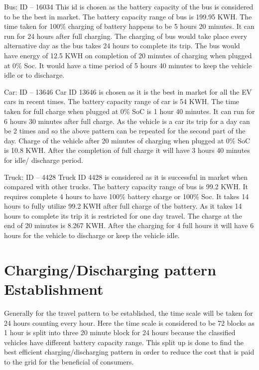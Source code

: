 	Bus: ID – 16034 \cite{evdata}
	This id is chosen as the battery capacity of the bus is considered to be the best in market. The
	battery capacity range of bus is 199.95 KWH. The time taken for 100\% charging of battery
	happens to be 5 hours 20 minutes. It can run for 24 hours after full charging. The charging of
	bus would take place every alternative day as the bus takes 24 hours to complete its trip. The
	bus would have energy of 12.5 KWH on completion of 20 minutes of charging when plugged
	at 0\% Soc. It would have a time period of 5 hours 40 minutes to keep the vehicle idle or to
	discharge.
	
	Car: ID – 13646 \cite{evdata}
	Car ID 13646 is chosen as it is the best in market for all the EV cars in recent times. The
	battery capacity range of car is 54 KWH. The time taken for full charge when plugged at 0\%
	SoC is 1 hour 40 minutes. It can run for 6 hours 30 minutes after full charge. As the vehicle is
	a car its trip for a day can be 2 times and so the above pattern can be repeated for the second
	part of the day. Charge of the vehicle after 20 minutes of charging when plugged at 0\% SoC
	is 10.8 KWH. After the completion of full charge it will have 3 hours 40 minutes for idle/
	discharge period.
	
	Truck: ID – 4428 \cite{evdata}
	Truck ID 4428 is considered as it is successful in market when compared with other trucks.
	The battery capacity range of bus is 99.2 KWH. It requires complete 4 hours to have 100\%
	battery charge or 100\% Soc. It takes 14 hours to fully utilize 99.2 KWH after full charge of
	the battery. As it takes 14 hours to complete its trip it is restricted for one day travel. The
	charge at the end of 20 minutes is 8.267 KWH. After the charging for 4 full hours it will have
	6 hours for the vehicle to discharge or keep the vehicle idle.
	
	\section{Charging/Discharging pattern Establishment}
	
	Generally for the travel pattern to be established, the time scale will be taken for 24 hours
	counting every hour. Here the time scale is considered to be 72 blocks as 1 hour is split into
	three 20 minute block for 24 hours because the classified vehicles have different battery
	capacity range. This split up is done to find the best efficient charging/discharging pattern in
	order to reduce the cost that is paid to the grid for the beneficial of consumers.
	
